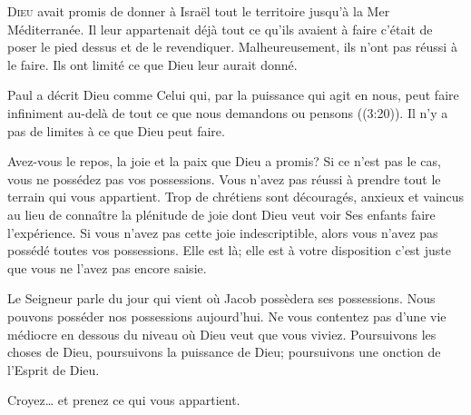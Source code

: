 \dvrule






\lettrine{D}{ieu} avait promis de donner à Israël tout le territoire
 jusqu'à la Mer Méditerranée. Il leur appartenait déjà
 \ocadr tout ce qu'ils avaient à faire c'était de poser le pied dessus
 et de le revendiquer. Malheureusement, ils n'ont pas réussi à le faire.
 Ils ont limité ce que Dieu leur aurait donné. 

Paul a décrit Dieu comme \Og Celui qui, par la puissance qui agit en nous,
 peut faire infiniment au-delà de tout ce que nous demandons ou pensons \Fg{}
 ((3:20)). Il n'y a pas de limites à ce que Dieu peut faire. 


Avez-vous le repos, la joie et la paix que Dieu a promis?
 Si ce n'est pas le cas, vous ne possédez pas vos possessions.
 Vous n'avez pas réussi à prendre tout le terrain qui vous appartient.
 Trop de chrétiens sont découragés, anxieux et vaincus au lieu de connaître
 la plénitude de joie dont Dieu veut voir Ses enfants faire l'expérience.
 Si vous n'avez pas cette joie indescriptible, alors vous n'avez pas possédé
 toutes vos possessions. Elle est là; elle est à votre disposition
 \ocadr c'est juste que vous ne l'avez pas encore saisie. 

Le Seigneur parle du jour qui vient où Jacob possèdera ses possessions.
 Nous pouvons posséder nos possessions aujourd'hui.
 Ne vous contentez pas d'une vie médiocre en dessous du niveau
 où Dieu veut que vous viviez. Poursuivons les choses de Dieu,
 poursuivons la puissance de Dieu;
 poursuivons une onction de l'Esprit de Dieu. 

Croyez\dots{} et prenez ce qui vous appartient. 

\dvrule



